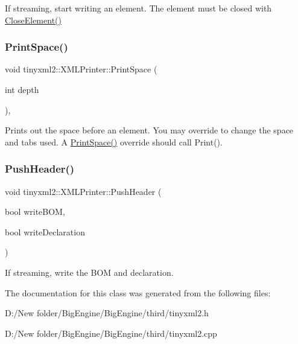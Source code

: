 If streaming, start writing an element. The element must be closed with \mbox{\hyperlink{classtinyxml2_1_1_x_m_l_printer_af1fb439e5d800999646f333fa2f0699a}{Close\+Element()}} \mbox{\label{classtinyxml2_1_1_x_m_l_printer_a1c4b2ccbe4fdb316d54f5a93f3559260}} 
\subsubsection{\texorpdfstring{Print\+Space()}{PrintSpace()}}
{\footnotesize\ttfamily void tinyxml2\+::\+X\+M\+L\+Printer\+::\+Print\+Space (\begin{DoxyParamCaption}\item[{int}]{depth }\end{DoxyParamCaption})\hspace{0.3cm}{\ttfamily [protected]}, {\ttfamily [virtual]}}

Prints out the space before an element. You may override to change the space and tabs used. A \mbox{\hyperlink{classtinyxml2_1_1_x_m_l_printer_a1c4b2ccbe4fdb316d54f5a93f3559260}{Print\+Space()}} override should call Print(). \mbox{\label{classtinyxml2_1_1_x_m_l_printer_a178c608ce8476043d5d6513819cde903}} 
\subsubsection{\texorpdfstring{Push\+Header()}{PushHeader()}}
{\footnotesize\ttfamily void tinyxml2\+::\+X\+M\+L\+Printer\+::\+Push\+Header (\begin{DoxyParamCaption}\item[{bool}]{write\+B\+OM,  }\item[{bool}]{write\+Declaration }\end{DoxyParamCaption})}

If streaming, write the B\+OM and declaration. 

The documentation for this class was generated from the following files\+:\begin{DoxyCompactItemize}
\item 
D\+:/\+New folder/\+Big\+Engine/\+Big\+Engine/third/tinyxml2.\+h\item 
D\+:/\+New folder/\+Big\+Engine/\+Big\+Engine/third/tinyxml2.\+cpp\end{DoxyCompactItemize}
